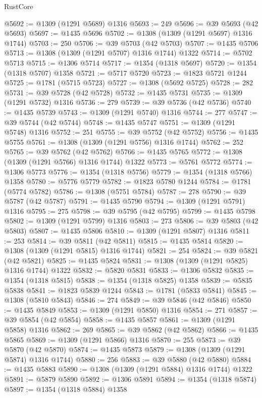 \begin{lexlean}{RustCore}
\begin{coremodule}
@5692 := @1309 (@1291 @5689) @1316
@5693 := 249
@5696 := @39 @5693 (@42 @5693)
@5697 := @1435 @5696
@5702 := @1308 (@1309 (@1291 @5697) @1316 @1744)
@5703 := 250
@5706 := @39 @5703 (@42 @5703)
@5707 := @1435 @5706
@5713 := @1308 (@1309 (@1291 @5707) @1316 @1744) @1322
@5714 := @5702 @5713
@5715 := @1306 @5714
@5717 := @1354 (@1318 @5697)
@5720 := @1354 (@1318 @5707) @1358
@5721 := @5717 @5720
@5723 := @1823 @5721 @1244
@5725 := @1781 (@5715 @5723)
@5727 := @1308 (@5692 @5725)
@5728 := 282
@5731 := @39 @5728 (@42 @5728)
@5732 := @1435 @5731
@5735 := @1309 (@1291 @5732) @1316
@5736 := 279
@5739 := @39 @5736 (@42 @5736)
@5740 := @1435 @5739
@5743 := @1309 (@1291 @5740) @1316
@5744 := 277
@5747 := @39 @5744 (@42 @5744)
@5748 := @1435 @5747
@5751 := @1309 (@1291 @5748) @1316
@5752 := 251
@5755 := @39 @5752 (@42 @5752)
@5756 := @1435 @5755
@5761 := @1308 (@1309 (@1291 @5756) @1316 @1744)
@5762 := 252
@5765 := @39 @5762 (@42 @5762)
@5766 := @1435 @5765
@5772 := @1308 (@1309 (@1291 @5766) @1316 @1744) @1322
@5773 := @5761 @5772
@5774 := @1306 @5773
@5776 := @1354 (@1318 @5756)
@5779 := @1354 (@1318 @5766) @1358
@5780 := @5776 @5779
@5782 := @1823 @5780 @1244
@5784 := @1781 (@5774 @5782)
@5786 := @1308 (@5751 @5784)
@5787 := 278
@5790 := @39 @5787 (@42 @5787)
@5791 := @1435 @5790
@5794 := @1309 (@1291 @5791) @1316
@5795 := 275
@5798 := @39 @5795 (@42 @5795)
@5799 := @1435 @5798
@5802 := @1309 (@1291 @5799) @1316
@5803 := 273
@5806 := @39 @5803 (@42 @5803)
@5807 := @1435 @5806
@5810 := @1309 (@1291 @5807) @1316
@5811 := 253
@5814 := @39 @5811 (@42 @5811)
@5815 := @1435 @5814
@5820 := @1308 (@1309 (@1291 @5815) @1316 @1744)
@5821 := 254
@5824 := @39 @5821 (@42 @5821)
@5825 := @1435 @5824
@5831 := @1308 (@1309 (@1291 @5825) @1316 @1744) @1322
@5832 := @5820 @5831
@5833 := @1306 @5832
@5835 := @1354 (@1318 @5815)
@5838 := @1354 (@1318 @5825) @1358
@5839 := @5835 @5838
@5841 := @1823 @5839 @1244
@5843 := @1781 (@5833 @5841)
@5845 := @1308 (@5810 @5843)
@5846 := 274
@5849 := @39 @5846 (@42 @5846)
@5850 := @1435 @5849
@5853 := @1309 (@1291 @5850) @1316
@5854 := 271
@5857 := @39 @5854 (@42 @5854)
@5858 := @1435 @5857
@5861 := @1309 (@1291 @5858) @1316
@5862 := 269
@5865 := @39 @5862 (@42 @5862)
@5866 := @1435 @5865
@5869 := @1309 (@1291 @5866) @1316
@5870 := 255
@5873 := @39 @5870 (@42 @5870)
@5874 := @1435 @5873
@5879 := @1308 (@1309 (@1291 @5874) @1316 @1744)
@5880 := 256
@5883 := @39 @5880 (@42 @5880)
@5884 := @1435 @5883
@5890 := @1308 (@1309 (@1291 @5884) @1316 @1744) @1322
@5891 := @5879 @5890
@5892 := @1306 @5891
@5894 := @1354 (@1318 @5874)
@5897 := @1354 (@1318 @5884) @1358

\end{coremodule}
\end{lexlean}
